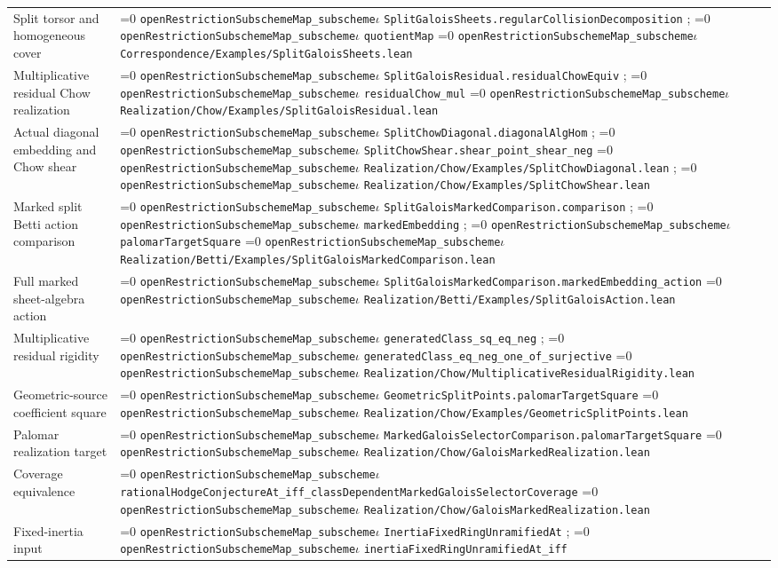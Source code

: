 \documentclass[11pt]{article}
\theoremstyle{definition}
\theoremstyle{remark}
\newcommand{\leanpath}[1]{%
  \ifnum\pdfstrcmp{\detokenize{#1}}%
      {\detokenize{openRestrictionSubschemeMap_subschemeι}}=0
    \texttt{\nolinkurl{openRestrictionSubschemeMap_subscheme}}\ensuremath{\iota}%
  \else
    \texttt{\nolinkurl{#1}}%
  \fi}
\begin{document}
\begin{longtable}{@{}>{\raggedright\arraybackslash}p{}
                >{\raggedright\arraybackslash}p{}@{}}
Split torsor and homogeneous cover &
\leanpath{SplitGaloisSheets.regularCollisionDecomposition};
\leanpath{quotientMap}\newline
\leanpath{Correspondence/Examples/SplitGaloisSheets.lean}\\
Multiplicative residual Chow realization &
\leanpath{SplitGaloisResidual.residualChowEquiv};
\leanpath{residualChow_mul}\newline
\leanpath{Realization/Chow/Examples/SplitGaloisResidual.lean}\\
Actual diagonal embedding and Chow shear &
\leanpath{SplitChowDiagonal.diagonalAlgHom};
\leanpath{SplitChowShear.shear_point_shear_neg}\newline
\leanpath{Realization/Chow/Examples/SplitChowDiagonal.lean};
\leanpath{Realization/Chow/Examples/SplitChowShear.lean}\\
Marked split Betti action comparison &
\leanpath{SplitGaloisMarkedComparison.comparison};
\leanpath{markedEmbedding}; \leanpath{palomarTargetSquare}\newline
\leanpath{Realization/Betti/Examples/SplitGaloisMarkedComparison.lean}\\
Full marked sheet-algebra action &
\leanpath{SplitGaloisMarkedComparison.markedEmbedding_action}\newline
\leanpath{Realization/Betti/Examples/SplitGaloisAction.lean}\\
Multiplicative residual rigidity &
\leanpath{generatedClass_sq_eq_neg};
\leanpath{generatedClass_eq_neg_one_of_surjective}\newline
\leanpath{Realization/Chow/MultiplicativeResidualRigidity.lean}\\
Geometric-source coefficient square &
\leanpath{GeometricSplitPoints.palomarTargetSquare}\newline
\leanpath{Realization/Chow/Examples/GeometricSplitPoints.lean}\\
Palomar realization target &
\leanpath{MarkedGaloisSelectorComparison.palomarTargetSquare}\newline
\leanpath{Realization/Chow/GaloisMarkedRealization.lean}\\
Coverage equivalence &
\leanpath{rationalHodgeConjectureAt_iff_classDependentMarkedGaloisSelectorCoverage}\newline
\leanpath{Realization/Chow/GaloisMarkedRealization.lean}\\
Fixed-inertia input &
\leanpath{InertiaFixedRingUnramifiedAt};
\leanpath{inertiaFixedRingUnramifiedAt_iff}\newline

\end{longtable}
\end{document}
